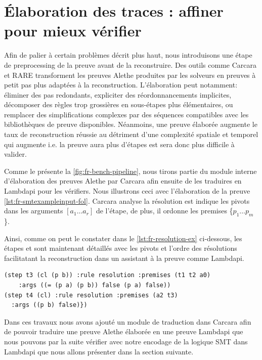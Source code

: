 \section*{Élaboration des traces : affiner pour mieux vérifier}

Afin de palier à certain problèmes décrit plus haut, nous introduisons une étape de preprocessing de la preuve avant de la reconstruire.
Des outils comme Carcara \cite{carcara} et RARE \cite{rare,IsaRare} transforment les preuves Alethe produites par les solveurs en preuves à petit pas plus adaptées à la reconstruction.
L'élaboration peut notamment: éliminer des pas redondants, expliciter des réordonnancements implicites, décomposer des règles trop grossières en sous-étapes plus élémentaires, ou remplacer des simplifications complexes par des séquences compatibles avec les bibliothèques de preuve disponibles.
Néanmoins, une preuve élaborée augmente le taux de reconstruction réussie au détriment d'une complexité spatiale et temporel qui augmente i.e. la preuve aura plus d'étapes est sera donc plus difficile à valider.

Comme le présente la \cref{fig:fr-bench-pipeline}, nous tirons partie du module interne d'élaboration des preuves Alethe par Carcara afin ensuite de les traduires en Lambdapi pour les vérifiers.
Nous illustrons ceci avec l'élaboration de la preuve \cref{lst:fr-smtexampleinput-fol}. Carcara analyse la résolution est indique les pivots dans les arguments \colorbox{rxpink!30}{$[a_1 \dots a_r]$} de l'étape, de plus,
il ordonne les premises \{\colorbox{darkpurple!30}{$p_1 \dots p_m$}\}.

Ainsi, comme on peut le constater dans le \cref{lst:fr-resolution-ex} ci-dessous, les étapes  et  sont maintenant détaillés avec les pivots et l'ordre des résolutions facilitatant la reconstruction dans un assistant à la preuve comme Lambdapi.
 
\begin{lstlisting}[language=SMT,numbers=none, label={lst:fr-resolution-ex}, caption={Elaboration des étapes de résolutions de \cref{lst:fr-smtexampleinput-fol} par Carcara}, nolol]
(step t3 (cl (p b)) :rule resolution :premises (t1 t2 a0)
    :args ((= (p a) (p b)) false (p a) false))
(step t4 (cl) :rule resolution :premises (a2 t3)
  :args ((p b) false)})
\end{lstlisting}

Dans ces travaux nous avons ajouté un module de traduction dans Carcara afin de pouvoir traduire une preuve Alethe élaborée en une preuve Lambdapi que nous pouvons par la suite vérifier avec notre encodage de la logique SMT dans Lambdapi que nous allons présenter dans la section suivante.

